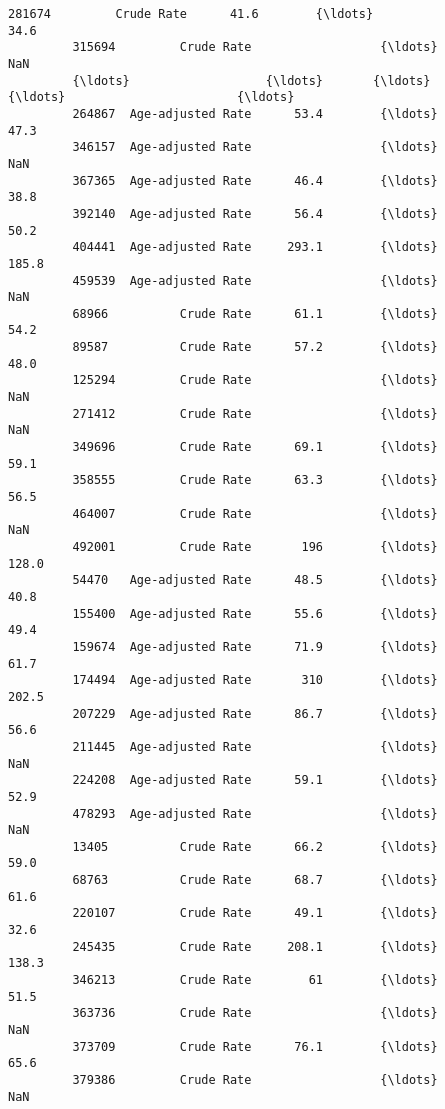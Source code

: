 \documentclass[11pt]{article}
\begin{document}
\begin{Verbatim}[commandchars=\\\{\}]
         281674         Crude Rate      41.6        {\ldots}                       34.6   
         315694         Crude Rate                  {\ldots}                        NaN   
         {\ldots}                   {\ldots}       {\ldots}        {\ldots}                        {\ldots}   
         264867  Age-adjusted Rate      53.4        {\ldots}                       47.3   
         346157  Age-adjusted Rate                  {\ldots}                        NaN   
         367365  Age-adjusted Rate      46.4        {\ldots}                       38.8   
         392140  Age-adjusted Rate      56.4        {\ldots}                       50.2   
         404441  Age-adjusted Rate     293.1        {\ldots}                      185.8   
         459539  Age-adjusted Rate                  {\ldots}                        NaN   
         68966          Crude Rate      61.1        {\ldots}                       54.2   
         89587          Crude Rate      57.2        {\ldots}                       48.0   
         125294         Crude Rate                  {\ldots}                        NaN   
         271412         Crude Rate                  {\ldots}                        NaN   
         349696         Crude Rate      69.1        {\ldots}                       59.1   
         358555         Crude Rate      63.3        {\ldots}                       56.5   
         464007         Crude Rate                  {\ldots}                        NaN   
         492001         Crude Rate       196        {\ldots}                      128.0   
         54470   Age-adjusted Rate      48.5        {\ldots}                       40.8   
         155400  Age-adjusted Rate      55.6        {\ldots}                       49.4   
         159674  Age-adjusted Rate      71.9        {\ldots}                       61.7   
         174494  Age-adjusted Rate       310        {\ldots}                      202.5   
         207229  Age-adjusted Rate      86.7        {\ldots}                       56.6   
         211445  Age-adjusted Rate                  {\ldots}                        NaN   
         224208  Age-adjusted Rate      59.1        {\ldots}                       52.9   
         478293  Age-adjusted Rate                  {\ldots}                        NaN   
         13405          Crude Rate      66.2        {\ldots}                       59.0   
         68763          Crude Rate      68.7        {\ldots}                       61.6   
         220107         Crude Rate      49.1        {\ldots}                       32.6   
         245435         Crude Rate     208.1        {\ldots}                      138.3   
         346213         Crude Rate        61        {\ldots}                       51.5   
         363736         Crude Rate                  {\ldots}                        NaN   
         373709         Crude Rate      76.1        {\ldots}                       65.6   
         379386         Crude Rate                  {\ldots}                        NaN   
         

\end{Verbatim}
\end{document}
